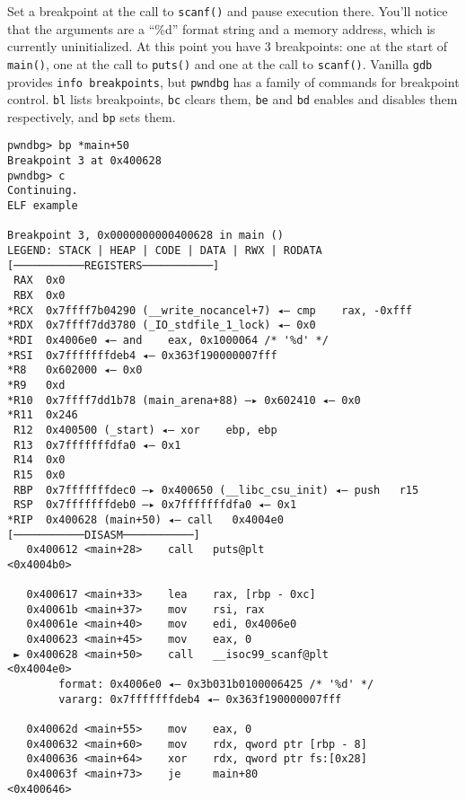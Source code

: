 \documentclass{article}
\begin{document}
Set a breakpoint at the call to \texttt{scanf()} and pause execution there.
You'll notice that the arguments are a ``\%d'' format string and a memory
address, which is currently uninitialized. At this point you have 3 breakpoints:
one at the start of \texttt{main()}, one at the call to \texttt{puts()} and one
at the call to \texttt{scanf()}. Vanilla \texttt{gdb} provides \texttt{info
breakpoints}, but \texttt{pwndbg} has a family of commands for breakpoint
control. \texttt{bl} lists breakpoints, \texttt{bc} clears them,
\texttt{be} and \texttt{bd} enables and disables them respectively, and
\texttt{bp} sets them.

\begin{lstlisting}
pwndbg> bp *main+50
Breakpoint 3 at 0x400628
pwndbg> c
Continuing.
ELF example

Breakpoint 3, 0x0000000000400628 in main ()
LEGEND: STACK | HEAP | CODE | DATA | RWX | RODATA
[───────────REGISTERS───────────]
 RAX  0x0
 RBX  0x0
*RCX  0x7ffff7b04290 (__write_nocancel+7) ◂— cmp    rax, -0xfff
*RDX  0x7ffff7dd3780 (_IO_stdfile_1_lock) ◂— 0x0
*RDI  0x4006e0 ◂— and    eax, 0x1000064 /* '%d' */
*RSI  0x7fffffffdeb4 ◂— 0x363f190000007fff
*R8   0x602000 ◂— 0x0
*R9   0xd
*R10  0x7ffff7dd1b78 (main_arena+88) —▸ 0x602410 ◂— 0x0
*R11  0x246
 R12  0x400500 (_start) ◂— xor    ebp, ebp
 R13  0x7fffffffdfa0 ◂— 0x1
 R14  0x0
 R15  0x0
 RBP  0x7fffffffdec0 —▸ 0x400650 (__libc_csu_init) ◂— push   r15
 RSP  0x7fffffffdeb0 —▸ 0x7fffffffdfa0 ◂— 0x1
*RIP  0x400628 (main+50) ◂— call   0x4004e0
[───────────DISASM───────────]
   0x400612 <main+28>    call   puts@plt                      <0x4004b0>
 
   0x400617 <main+33>    lea    rax, [rbp - 0xc]
   0x40061b <main+37>    mov    rsi, rax
   0x40061e <main+40>    mov    edi, 0x4006e0
   0x400623 <main+45>    mov    eax, 0
 ► 0x400628 <main+50>    call   __isoc99_scanf@plt            <0x4004e0>
        format: 0x4006e0 ◂— 0x3b031b0100006425 /* '%d' */
        vararg: 0x7fffffffdeb4 ◂— 0x363f190000007fff
 
   0x40062d <main+55>    mov    eax, 0
   0x400632 <main+60>    mov    rdx, qword ptr [rbp - 8]
   0x400636 <main+64>    xor    rdx, qword ptr fs:[0x28]
   0x40063f <main+73>    je     main+80                       <0x400646>
 

\end{lstlisting}
\end{document}
